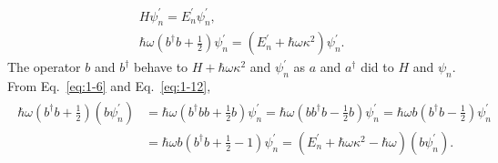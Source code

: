 \documentclass[floatfix,nofootinbib,superscriptaddress,fleqn]{revtex4-2}
\begin{document}
\begin{itemize}
    \begin{align}\label{eq:1-11}
      &H \psi^\prime_n = E^\prime_n\psi^\prime_n,  \\
      \label{eq:1-12} &\hbar\omega\left(b^\dagger b
      + \frac{1}{2}\right)\psi^\prime_n 
      = \left(E^\prime_n+\hbar\omega\kappa^2\right)\psi^\prime_n.
    \end{align}
    The operator $b$ and $b^\dagger$ behave to 
    $H+\hbar\omega\kappa^2$ and $\psi_n^\prime$
    as $a$ and $a^\dagger$ did to $H$ and $\psi_n$.
    From Eq.~\eqref{eq:1-6} and Eq.~\eqref{eq:1-12},
    \begin{align}
      \begin{split}
      \label{eq:1-13}
        \hbar\omega\left(b^\dagger b
    + \frac{1}{2}\right)(b\psi^\prime_n) 
    &=\hbar\omega\left(b^\dagger bb
    + \frac{1}{2}b\right)\psi^\prime_n
    =\hbar\omega\left(bb^\dagger b
    - \frac{1}{2}b\right)\psi^\prime_n
    =\hbar\omega b\left(b^\dagger b
    - \frac{1}{2}\right)\psi^\prime_n \\
    &=\hbar\omega b\left(b^\dagger b
    + \frac{1}{2}-1\right)\psi^\prime_n
    =\left(E^\prime_n+\hbar\omega\kappa^2-\hbar\omega\right)
    (b\psi^\prime_n).
    \end{split}  
  \end{align}
    

\end{itemize}
\end{document}
